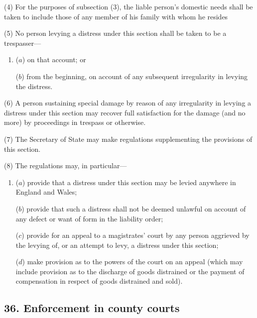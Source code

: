 \documentclass[12pt,a4paper]{article}
\begin{document}
(4) For the purposes of subsection (3), the liable person’s domestic needs shall be 
taken to include those of any member of his family with whom he resides

(5) No person levying a distress under this section shall be taken to be a trespasser---
\begin{enumerate}\item[]
 ($a$) on that account; or 

($b$) from the beginning, on account of any subsequent irregularity in levying the distress.
\end{enumerate}

(6) A person sustaining special damage by reason of any irregularity in levying a distress under this section may recover full satisfaction for the damage (and no more) by proceedings in trespass or otherwise.

(7) The Secretary of State may make regulations supplementing the provisions of this section.

(8) The regulations may, in particular---
\begin{enumerate}\item[]
 ($a$) provide that a distress under this section may be levied anywhere in England and Wales;

($b$) provide that such a distress shall not be deemed unlawful on account of any defect or want of form in the liability order;

($c$) provide for an appeal to a magistrates’ court by any person aggrieved by the levying of, or an attempt to levy, a distress under this section;

($d$) make provision as to the powers of the court on an appeal (which may include provision as to the discharge of goods distrained or the payment of compensation in respect of goods distrained and sold).
\end{enumerate}


\subsection{36. Enforcement in county courts}
\end{document}
